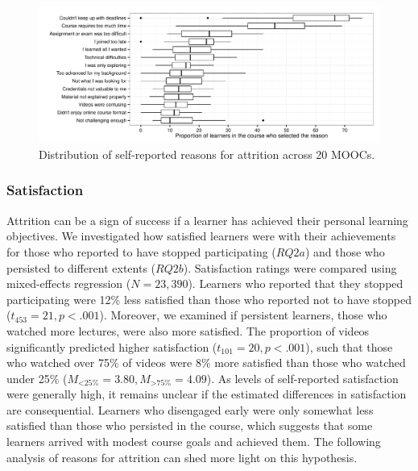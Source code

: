 \documentclass{sigchi}\usepackage[]{graphicx}\usepackage[]{color}
\makeatletter
\def\maxwidth{ %
  \ifdim\Gin@nat@width>\linewidth
    \linewidth
  \else
    \Gin@nat@width
  \fi
}
\newenvironment{knitrout}{}{} %
\makeatother
\begin{document}
\begin{knitrout}
\color{fgcolor}\begin{figure}[ht]

\includegraphics[width=\maxwidth]{figure/s1reason} \caption[Distribution of self-reported reasons for attrition across 20 MOOCs]{Distribution of self-reported reasons for attrition across 20 MOOCs.\label{fig:s1reason}}
\end{figure}


\end{knitrout}

\subsubsection{Satisfaction}

Attrition can be a sign of success if a learner has achieved their personal learning objectives. We investigated how satisfied learners were with their achievements for those who reported to have stopped participating ($RQ2a$) and those who persisted to different extents ($RQ2b$). Satisfaction ratings were compared using mixed-effects regression ($N=23,390$). Learners who reported that they stopped participating were 12\% less satisfied than those who reported not to have stopped ($t_{453}=21, p<.001$). Moreover, we examined if persistent learners, those who watched more lectures, were also more satisfied. The proportion of videos significantly predicted higher satisfaction ($t_{101}=20, p<.001$), such that those who watched over 75\% of videos were 8\% more satisfied than those who watched under 25\% ($M_{<\text{25\%}}=3.80, M_{>\text{75\%}}=4.09$). As levels of self-reported satisfaction were generally high, it remains unclear if the estimated differences in satisfaction are consequential. Learners who disengaged early were only somewhat less satisfied than those who persisted in the course, which suggests that some learners arrived with modest course goals and achieved them. The following analysis of reasons for attrition can shed more light on this hypothesis.
\end{document}
